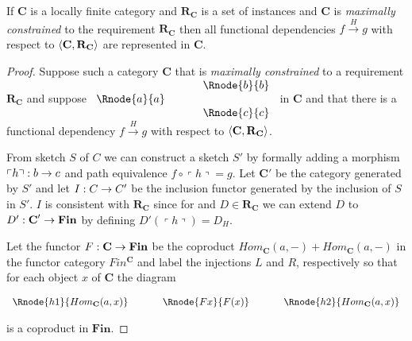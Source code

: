 \documentclass[10pt,a4paper]{article}
\theoremstyle{remark}
\newcommand{\catc}[1][C]{\textbf{#1}}
\newcommand{\catcp}[1][C]{\textbf{#1}'}
\newcommand{\reqt}{\textbf{R}}
\newcommand{\reqtc}[1][\catc]{\reqt_{#1}}
\newcommand{\Fin}{\ensuremath{\textbf{Fin}} }
\newcommand{\fundep}[3]{#2 \xrightarrow{#1} #3}
\newcommand{\qq}[1]{
\left\ulcorner#1\right\urcorner
}
\newcommand{\term}[1]{\textit{#1}}  %
\begin{document}
\begin{lemma}
If $\catc$ is a locally finite category and $\reqtc$ is a set of instances  and $\catc$ is 
\term{maximally constrained} to the requirement $\reqtc$ then
all functional dependencies $\fundep{H}{f}{g}$  with respect to $\tuple{\catc,\reqtc}$ are represented in $\catc$.
\end{lemma}
\begin{proof}
Suppose such a category  $\catc$  that  is 
\term{maximally constrained} to a requirement $\reqtc$ and suppose
$
\begin{array}{c p{0.5cm} c  }
             &&   \Rnode{b}{b} \\[0.01cm]
\Rnode{a}{a} &&                \\[0.01cm] 
             &&   \Rnode{c}{c}         
\end{array} 
$
in $\catc$ 
and that there is a functional dependency $\fundep{H}{f}{g}$ with respect to $\tuple{\catc,\reqtc}$.

From sketch $S$ of $C$ we can construct a sketch $S'$ by formally adding a morphism $\qq{h}: b \morph c$
and path equivalence $f \circ \qq{h} = g$. Let $\catcp$ be the category generated by $S'$ and
let $I: C \rightarrow C'$ be the inclusion functor generated by the inclusion of $S$ in $S'$. 
$I$ is consistent with $\reqtc$ since for and $D \in \reqtc$ we can extend $D$ to $D' :\catcp \morph \Fin$ by defining $D'(\qq{h})=D_H$.

Let the functor $F: \catc \morph \Fin$ be the coproduct $Hom_{\catc}(a,-) + Hom_{\catc}(a,-)$
in the functor category $Fin^{\catc}$ and label the injections $L$ and $R$, respectively so that
for each object $x$ of $\catc$ the diagram
\begin{center}
$
\begin{array}{c p{0.5cm} c p{0.5cm} c  }
\Rnode{h1}{Hom_{\catc}(a,x)}  &&\Rnode{Fx}{F(x)}  &&   \Rnode{h2}{Hom_{\catc}(a,x)}       
\end{array} 
$
\end{center}
is a coproduct in $\Fin$.


\end{proof}
\end{document}
